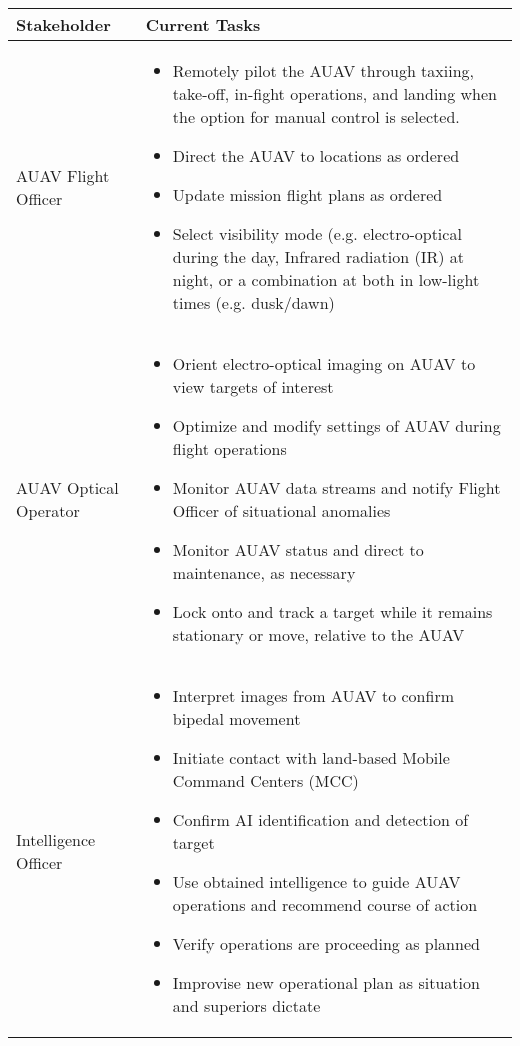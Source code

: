 \begin{fullwidth}
    \begin{longtable}{ | p{5cm} | p{12cm} | }
        \hline
        Stakeholder & Current Tasks \\
        \hline
        AUAV Flight Officer &
        \begin{itemize}
            \item Remotely pilot the AUAV through taxiing, take-off, in-fight operations, and landing when the option for manual control is selected.
            \item Direct the AUAV to locations as ordered
            \item Update mission flight plans as ordered
            \item Select visibility mode (e.g. electro-optical during the day, Infrared radiation (IR) at night, or a combination at both in low-light times (e.g. dusk/dawn)
        \end{itemize} \\
        \hline
        AUAV Optical Operator &
        \begin{itemize}
            \item Orient electro-optical imaging on AUAV to view targets of interest
            \item Optimize and modify settings of AUAV during flight operations
            \item Monitor AUAV data streams and notify Flight Officer of situational anomalies
            \item Monitor AUAV status and direct to maintenance, as necessary
            \item Lock onto and track a target  while it remains stationary or move, relative to the AUAV
        \end{itemize} \\
        \hline
        Intelligence Officer &
        \begin{itemize}
            \item Interpret images from AUAV to confirm bipedal movement
            \item Initiate contact with land-based Mobile Command Centers (MCC)
            \item Confirm AI identification and detection of target
            \item Use obtained intelligence to guide AUAV operations and recommend course of action
            \item Verify operations are proceeding as planned
            \item Improvise new operational plan as situation and superiors dictate

\end{itemize}
\end{longtable}
\end{fullwidth}
